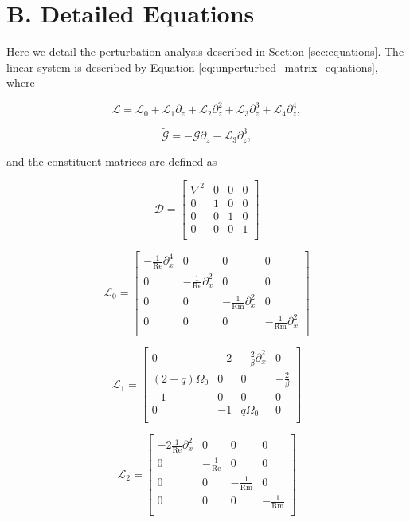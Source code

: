 \documentclass{emulateapj}
\newcommand{\beq}{\begin{equation}}
\newcommand{\eeq}{\end{equation}}
\newcommand\reye{\mathrm{Re}}
\newcommand\reym{\mathrm{Rm}}
\begin{document}
\section{B. Detailed Equations}\label{app:matrices}

Here we detail the perturbation analysis described in Section \ref{sec:equations}. The linear system is described by Equation \ref{eq:unperturbed_matrix_equations}, where 

\beq
\mathcal{L} = \mathcal{L}_0 + \mathcal{L}_1 \partial_z + \mathcal{L}_2 \partial_z^2 + \mathcal{L}_3 \partial_z^3 + \mathcal{L}_4 \partial_z^4,
\eeq

\beq
\widetilde{\mathcal{G}} = - \mathcal{G} \partial_z - \mathcal{L}_3 \partial_z^3,
\eeq

and the constituent matrices are defined as 

\beq
\mathcal{D} = \left[\begin{matrix}
\nabla^2 & 0 & 0 & 0 \\
0 & 1& 0 & 0 \\
0 & 0 & 1 & 0\\
0 & 0 & 0 & 1 \\
\end{matrix}\right]
\eeq

\beq
\mathcal{L}_0 = \left[\begin{matrix}
-\frac{1}{\reye}\partial_x^4 & 0 & 0 & 0 \\
0 & -\frac{1}{\reye}\partial_x^2 & 0 &0 \\
0 & 0 & -\frac{1}{\reym}\partial_x^2 & 0 \\
0 & 0 & 0 & -\frac{1}{\reym}\partial_x^2 \\ \end{matrix}\right]
\eeq

\beq
\mathcal{L}_1 = \left[\begin{matrix}
0 & -2 & -\frac{2}{\beta}\partial_x^2 & 0 \\
(2-q)\Omega_0 & 0 & 0 & -\frac{2}{\beta} \\
-1 & 0 & 0 & 0 \\
0 & -1 & q\Omega_0 & 0 \\ \end{matrix}\right] 
\eeq

\beq
\mathcal{L}_2 = \left[\begin{matrix}
-2\frac{1}{\reye} \partial_x^2 & 0 & 0 & 0 \\
0 & -\frac{1}{\reye} & 0 & 0 \\
0 & 0 & -\frac{1}{\reym} & 0 \\
0 & 0 & 0 & -\frac{1}{\reym} \\ \end{matrix}\right]
\eeq
\end{document}
